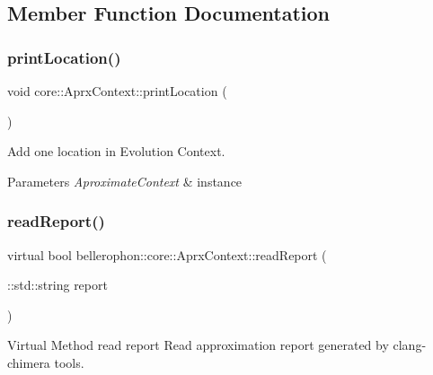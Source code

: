 \subsection{Member Function Documentation}
\hypertarget{classbellerophon_1_1core_1_1AprxContext_a3cbee10e05f6ef709f3663f2befff2db}{}\label{classbellerophon_1_1core_1_1AprxContext_a3cbee10e05f6ef709f3663f2befff2db} 
\subsubsection{\texorpdfstring{print\+Location()}{printLocation()}}
{\footnotesize\ttfamily void core\+::\+Aprx\+Context\+::print\+Location (\begin{DoxyParamCaption}{ }\end{DoxyParamCaption})}



Add one location in Evolution Context. 


\begin{DoxyParams}{Parameters}
{\em Aproximate\+Context} & instance \\
\hline
\end{DoxyParams}
\hypertarget{classbellerophon_1_1core_1_1AprxContext_a6f7863e6f7d7146807247dca43a5af28}{}\label{classbellerophon_1_1core_1_1AprxContext_a6f7863e6f7d7146807247dca43a5af28} 
\subsubsection{\texorpdfstring{read\+Report()}{readReport()}}
{\footnotesize\ttfamily virtual bool bellerophon\+::core\+::\+Aprx\+Context\+::read\+Report (\begin{DoxyParamCaption}\item[{\+::std\+::string}]{report }\end{DoxyParamCaption})\hspace{0.3cm}{\ttfamily [pure virtual]}}



Virtual Method read report  Read approximation report generated by clang-\/chimera tools. 

